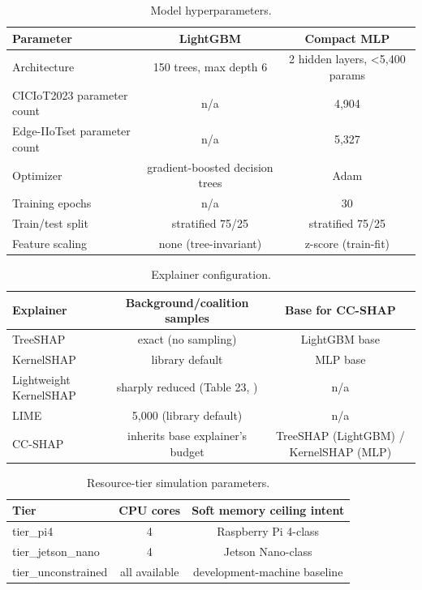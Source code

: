 \begin{table}[H] \caption{Model hyperparameters.\label{tabA1}} \begin{tabularx}{\textwidth}{LCC} \toprule \textbf{Parameter} & \textbf{LightGBM} & \textbf{Compact MLP} \\ \midrule Architecture & 150 trees, max depth 6 & 2 hidden layers, <5,400 params \\ CICIoT2023 parameter count & n/a & 4,904 \\ Edge-IIoTset parameter count & n/a & 5,327 \\ Optimizer & gradient-boosted decision trees & Adam \\ Training epochs & n/a & 30 \\ Train/test split & stratified 75/25 & stratified 75/25 \\ Feature scaling & none (tree-invariant) & z-score (train-fit) \\ \bottomrule \end{tabularx} \end{table}

\begin{table}[H] \caption{Explainer configuration.\label{tabA2}} \begin{tabularx}{\textwidth}{LCC} \toprule \textbf{Explainer} & \textbf{Background/coalition samples} & \textbf{Base for CC-SHAP} \\ \midrule TreeSHAP & exact (no sampling) & LightGBM base \\ KernelSHAP & library default & MLP base \\ Lightweight KernelSHAP & sharply reduced (Table 23, \citep{ref1}) & n/a \\ LIME & 5,000 (library default) & n/a \\ CC-SHAP & inherits base explainer's budget & TreeSHAP (LightGBM) / KernelSHAP (MLP) \\ \bottomrule \end{tabularx} \end{table}

\begin{table}[H] \caption{Resource-tier simulation parameters.\label{tabA3}} \begin{tabularx}{\textwidth}{LCC} \toprule \textbf{Tier} & \textbf{CPU cores} & \textbf{Soft memory ceiling intent} \\ \midrule tier\_pi4 & 4 & Raspberry Pi 4-class \\ tier\_jetson\_nano & 4 & Jetson Nano-class \\ tier\_unconstrained & all available & development-machine baseline \\ \bottomrule \end{tabularx} \end{table}

